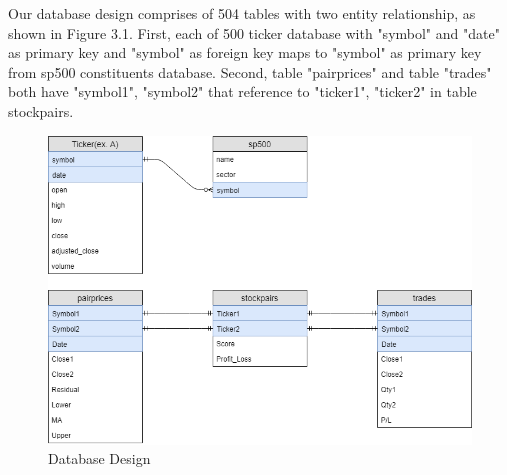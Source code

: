 Our database design comprises of 504 tables with two entity relationship, as shown in Figure 3.1. First, each of 500 ticker database with "symbol" and "date" as primary key and "symbol" as foreign key maps to "symbol" as primary key from sp500 constituents database. Second, table "pairprices" and table "trades" both have "symbol1", "symbol2" that reference to "ticker1", "ticker2" in table stockpairs.

\begin{figure}[h!]
\centering
\includegraphics[scale=0.45]{data/images/database.png}
\caption{Database Design}
\label{fig:database}
\end{figure}